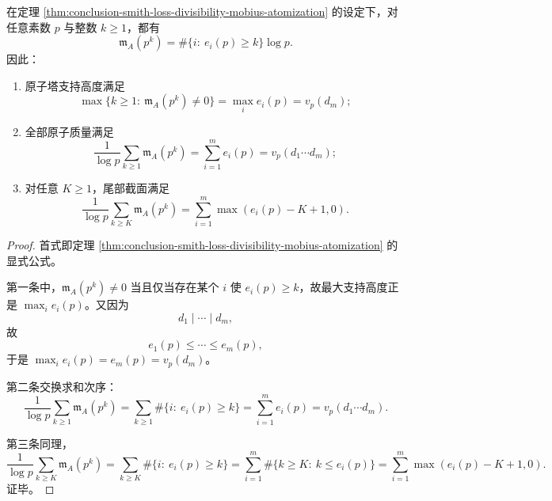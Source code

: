 \begin{corollary}\label{cor:conclusion-smith-mobius-atom-tower-height-mass-tail}
在定理 \ref{thm:conclusion-smith-loss-divisibility-mobius-atomization} 的设定下，对任意素数 \(p\) 与整数 \(k\ge 1\)，都有
\[
\mathfrak m_A(p^k)=\#\{i:\ e_i(p)\ge k\}\log p.
\]
因此：
\begin{enumerate}
  \item 原子塔支持高度满足
  \[
  \max\{k\ge 1:\ \mathfrak m_A(p^k)\neq 0\}
  =
  \max_i e_i(p)
  =
  v_p(d_m);
  \]
  \item 全部原子质量满足
  \[
  \frac{1}{\log p}\sum_{k\ge 1}\mathfrak m_A(p^k)
  =
  \sum_{i=1}^{m}e_i(p)
  =
  v_p(d_1\cdots d_m);
  \]
  \item 对任意 \(K\ge 1\)，尾部截面满足
  \[
  \frac{1}{\log p}\sum_{k\ge K}\mathfrak m_A(p^k)
  =
  \sum_{i=1}^{m}\max(e_i(p)-K+1,0).
  \]
\end{enumerate}
\end{corollary}
\begin{proof}
首式即定理 \ref{thm:conclusion-smith-loss-divisibility-mobius-atomization} 的显式公式。

第一条中，\(\mathfrak m_A(p^k)\neq 0\) 当且仅当存在某个 \(i\) 使 \(e_i(p)\ge k\)，故最大支持高度正是 \(\max_i e_i(p)\)。又因为
\[
d_1\mid \cdots \mid d_m,
\]
故
\[
e_1(p)\le \cdots \le e_m(p),
\]
于是 \(\max_i e_i(p)=e_m(p)=v_p(d_m)\)。

第二条交换求和次序：
\[
\frac{1}{\log p}\sum_{k\ge 1}\mathfrak m_A(p^k)
=
\sum_{k\ge 1}\#\{i:\ e_i(p)\ge k\}
=
\sum_{i=1}^{m}e_i(p)
=
v_p(d_1\cdots d_m).
\]

第三条同理，
\[
\frac{1}{\log p}\sum_{k\ge K}\mathfrak m_A(p^k)
=
\sum_{k\ge K}\#\{i:\ e_i(p)\ge k\}
=
\sum_{i=1}^{m}\#\{k\ge K:\ k\le e_i(p)\}
=
\sum_{i=1}^{m}\max(e_i(p)-K+1,0).
\]
证毕。
\end{proof}

